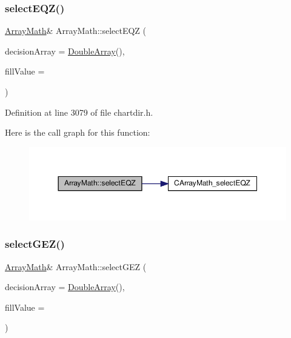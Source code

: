 \subsubsection{\texorpdfstring{select\+E\+Q\+Z()}{selectEQZ()}}
{\footnotesize\ttfamily \hyperlink{class_array_math}{Array\+Math}\& Array\+Math\+::select\+E\+QZ (\begin{DoxyParamCaption}\item[{\hyperlink{class_double_array}{Double\+Array}}]{decision\+Array = {\ttfamily \hyperlink{class_double_array}{Double\+Array}()},  }\item[{double}]{fill\+Value = {} }\end{DoxyParamCaption})\hspace{0.3cm}{\ttfamily [inline]}}



Definition at line 3079 of file chartdir.\+h.

Here is the call graph for this function\+:
\nopagebreak
\begin{figure}[H]
\begin{center}
\leavevmode
\includegraphics[width=350pt]{class_array_math_a7c219ae5049b2a515025f24ae5428a83_cgraph}
\end{center}
\end{figure}
\mbox{\label{class_array_math_adeaae3c00b4d38c471d5956d65861a48}} 
\subsubsection{\texorpdfstring{select\+G\+E\+Z()}{selectGEZ()}}
{\footnotesize\ttfamily \hyperlink{class_array_math}{Array\+Math}\& Array\+Math\+::select\+G\+EZ (\begin{DoxyParamCaption}\item[{\hyperlink{class_double_array}{Double\+Array}}]{decision\+Array = {\ttfamily \hyperlink{class_double_array}{Double\+Array}()},  }\item[{double}]{fill\+Value = {} }\end{DoxyParamCaption})\hspace{0.3cm}{\ttfamily [inline]}}



